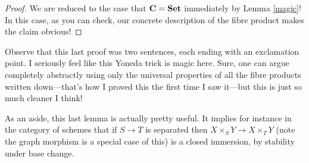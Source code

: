 \begin{proof}
  We are reduced to the case that $\mathbf{C} = \mathbf{Set}$ immediately by Lemma
  \ref{magic}! In this case, as you can check, our concrete
  description of the fibre product makes the claim obvious!
\end{proof}

Observe that this last proof was two sentences, each ending with an
exclamation point. I seriously feel like this Yoneda trick is magic
here. Sure, one can argue completely abstractly using only the
universal properties of all the fibre products written down---that's
how I proved this the first time I saw it---but this is just so much
cleaner I think!

\begin{remark}
  As an aside, this last lemma is actually pretty useful. It implies
  for instance in the category of schemes that if $S \to T$ is
  separated then $X \times_S Y \to X \times_T Y$ (note the graph
  morphism is a special case of this) is a closed immersion, by
  stability under base change.
\end{remark}






